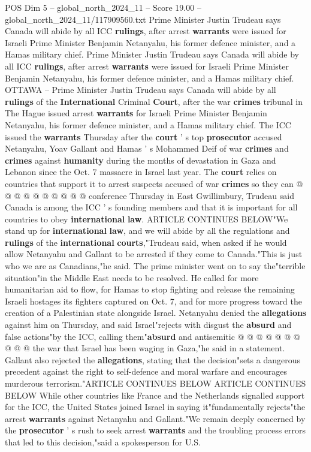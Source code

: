 \begin{textsample}{POS Dim 5 – global\_north\_2024\_11 – Score 19.00 – global\_north\_2024\_11/117909560.txt}  \label{ex:f5_pos_033}
Prime Minister Justin Trudeau says Canada will abide by all ICC \textbf{rulings}, after arrest \textbf{warrants} were issued for Israeli Prime Minister Benjamin Netanyahu, his former defence minister, and a Hamas military chief.
Prime Minister Justin Trudeau says Canada will abide by all ICC \textbf{rulings}, after arrest \textbf{warrants} were issued for Israeli Prime Minister Benjamin Netanyahu, his former defence minister, and a Hamas military chief.
OTTAWA -- Prime Minister Justin Trudeau says Canada will abide by all \textbf{rulings} of the \textbf{International} Criminal \textbf{Court}, after the war \textbf{crimes} tribunal in The Hague issued arrest \textbf{warrants} for Israeli Prime Minister Benjamin Netanyahu, his former defence minister, and a Hamas military chief.
The ICC issued the \textbf{warrants} Thursday after the \textbf{court} ' s top \textbf{prosecutor} accused Netanyahu, Yoav Gallant and Hamas ' s Mohammed Deif of war \textbf{crimes} and \textbf{crimes} against \textbf{humanity} during the months of devastation in Gaza and Lebanon since the Oct. 7 massacre in Israel last year.
The \textbf{court} relies on countries that support it to arrest suspects accused of war \textbf{crimes} so they can @ @ @ @ @ @ @ @ @ @ conference Thursday in East Gwillimbury, Trudeau said Canada is among the ICC ' s founding members and that it is important for all countries to obey \textbf{international} \textbf{law}.
ARTICLE CONTINUES BELOW"We stand up for \textbf{international} \textbf{law}, and we will abide by all the regulations and \textbf{rulings} of the \textbf{international} \textbf{courts},"Trudeau said, when asked if he would allow Netanyahu and Gallant to be arrested if they come to Canada."This is just who we are as Canadians,"he said.
The prime minister went on to say the"terrible situation"in the Middle East needs to be resolved.
He called for more humanitarian aid to flow, for Hamas to stop fighting and release the remaining Israeli hostages its fighters captured on Oct. 7, and for more progress toward the creation of a Palestinian state alongside Israel.
Netanyahu denied the \textbf{allegations} against him on Thursday, and said Israel"rejects with disgust the \textbf{absurd} and false actions"by the ICC, calling them"\textbf{absurd} and antisemitic @ @ @ @ @ @ @ @ @ @ the war that Israel has been waging in Gaza,"he said in a statement.
Gallant also rejected the \textbf{allegations}, stating that the decision"sets a dangerous precedent against the right to self-defence and moral warfare and encourages murderous terrorism."ARTICLE CONTINUES BELOW ARTICLE CONTINUES BELOW While other countries like France and the Netherlands signalled support for the ICC, the United States joined Israel in saying it"fundamentally rejects"the arrest \textbf{warrants} against Netanyahu and Gallant."We remain deeply concerned by the \textbf{prosecutor} ' s rush to seek arrest \textbf{warrants} and the troubling process errors that led to this decision,"said a spokesperson for U.S.

\end{textsample}
